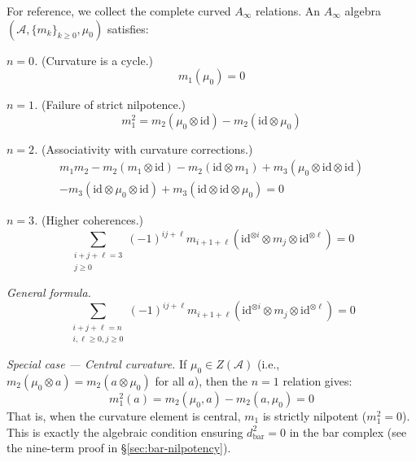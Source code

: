 For reference, we collect the complete curved $A_\infty$ relations. An $A_\infty$ algebra 
$(\mathcal{A}, \{m_k\}_{k \geq 0}, \mu_0)$ satisfies:

\emph{$n = 0$.} (Curvature is a cycle.)
\[m_1(\mu_0) = 0\]

\emph{$n = 1$.} (Failure of strict nilpotence.)
\[m_1^2 = m_2(\mu_0 \otimes \text{id}) - m_2(\text{id} \otimes \mu_0)\]

\emph{$n = 2$.} (Associativity with curvature corrections.)
\begin{multline}
m_1 m_2 - m_2(m_1 \otimes \text{id}) - m_2(\text{id} \otimes m_1) + m_3(\mu_0 \otimes \text{id} 
\otimes \text{id}) \\
- m_3(\text{id} \otimes \mu_0 \otimes \text{id}) + m_3(\text{id} \otimes \text{id} \otimes \mu_0) = 0
\end{multline}

\emph{$n = 3$.} (Higher coherences.)
\[\sum_{\substack{i+j+\ell = 3 \\ j \geq 0}} (-1)^{ij+\ell} m_{i+1+\ell}(\text{id}^{\otimes i}
\otimes m_j \otimes \text{id}^{\otimes \ell}) = 0\]

\emph{General formula.}
\[\sum_{\substack{i+j+\ell=n \\ i,\ell \geq 0, j \geq 0}} (-1)^{ij+\ell} m_{i+1+\ell}
(\text{id}^{\otimes i} \otimes m_j \otimes \text{id}^{\otimes \ell}) = 0\]

\emph{Special case --- Central curvature.}
If $\mu_0 \in Z(\mathcal{A})$ (i.e., $m_2(\mu_0 \otimes a) = m_2(a \otimes \mu_0)$ for all $a$), then the $n=1$ relation gives:
\[m_1^2(a) = m_2(\mu_0, a) - m_2(a, \mu_0) = 0\]
That is, when the curvature element is central, $m_1$ is strictly nilpotent ($m_1^2 = 0$). This is exactly the algebraic condition ensuring $d_{\text{bar}}^2 = 0$ in the bar complex (see the nine-term proof in \S\ref{sec:bar-nilpotency}).
